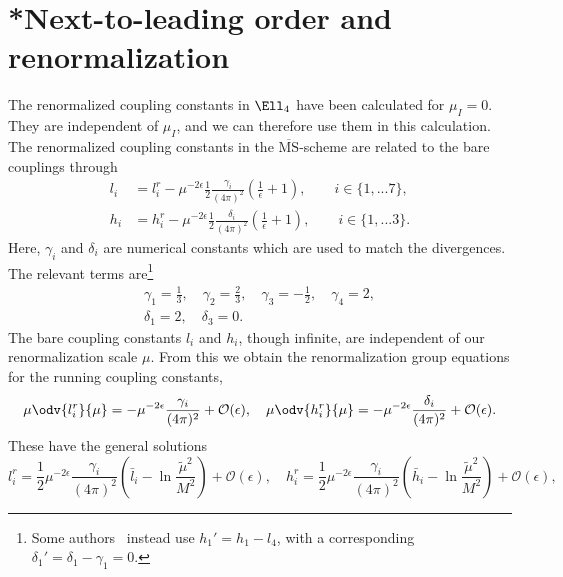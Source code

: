 \section{*Next-to-leading order and renormalization}


The renormalized coupling constants in $\Ell_4$ have been calculated for $\mu_I = 0$\autocite{gasserChiralPerturbationTheory1984}.
They are independent of $\mu_I$, and we can therefore use them in this calculation.
The renormalized coupling constants in the $\overline{\mathrm{MS}}$-scheme are related to the bare couplings through
%
\begin{align}
    l_i 
    & = 
    l_i^r 
    - \mu^{-2\epsilon}\frac{1}{2} \frac{\gamma_i }{(4 \pi)^2} 
    \left(\frac{1}{\epsilon} + 1 \right),
    \quad \quad
    i \in \{1, ... 7\},
    \\
    h_i 
    & = 
    h_i^r
    - \mu^{-2\epsilon} \frac{1}{2}  \frac{\delta_i }{(4 \pi)^2} 
    \left(\frac{1}{\epsilon} + 1 \right), 
    \quad \quad
    i \in \{1, ... 3\}.
\end{align}
%
Here, $\gamma_i$ and $\delta_i$ are numerical constants which are used to match the divergences.
The relevant terms are\footnote{Some authors~\autocite{adhikariTwoflavorChiralPerturbation2019,gerberHadronsChiralPhase1989} instead use $h_1' = h_1 - l_4$, with a corresponding $\delta_1' = \delta_1 - \gamma_1 = 0$.}
%
\begin{gather}
    \gamma_1 = \frac{1}{3}, \quad
    \gamma_2 = \frac{2}{3}, \quad
    \gamma_3 = - \frac{1}{2}, \quad
    \gamma_4 = 2, \\
    \delta_1 = 2, \quad
    \delta_3 = 0.
\end{gather}
%
The bare coupling constants $l_i$ and $h_i$, though infinite, are independent of our renormalization scale $\mu$.
From this we obtain the renormalization group equations for the running coupling constants,
\begin{equation}
    \mu \odv{l_i^r}{\mu } = - \mu^{-2\epsilon} \frac{\gamma_i }{(4 \pi)^2} + \mathcal{O}(\epsilon), \quad
    \mu \odv{h_i^r}{\mu } = -  \mu^{-2\epsilon}\frac{\delta_i}{(4 \pi)^2}+ \mathcal{O}(\epsilon).
\end{equation}
%
These have the general solutions
\begin{equation}
    l_i^r 
    = \frac{1}{2} \mu^{-2\epsilon} \frac{\gamma_i}{(4 \pi)^2} 
    \left( \bar l_i - \ln{\frac{\tilde \mu^2}{M^2}} \right)+ \mathcal{O}(\epsilon),
    \quad
    h_i^r 
    = \frac{1}{2} \mu^{-2\epsilon} \frac{\gamma_i}{(4 \pi)^2} 
    \left( \bar h_i - \ln{\frac{\tilde \mu^2}{M^2}} \right)+ \mathcal{O}(\epsilon),
\end{equation}
